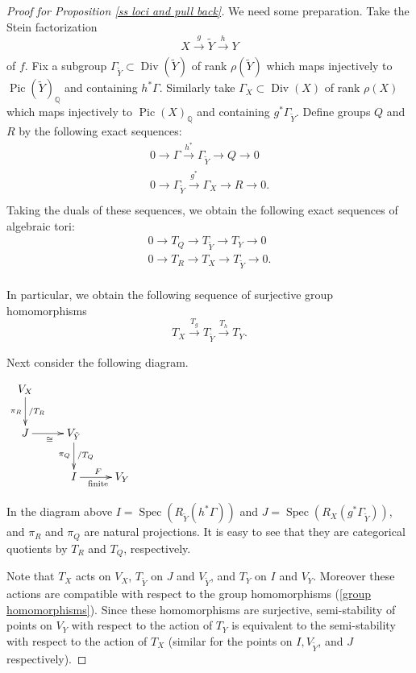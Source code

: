 \documentclass[12pt,twoside]{amsart}
\theoremstyle{definition}
\newcommand\Pic{\mathop{\mathrm{Pic}}\nolimits}
\newcommand\Spec{\mathop{\mathrm{Spec}}\nolimits}
\newcommand\Divi{\mathop{\mathrm{Div}}\nolimits}
\newcommand\bq{\mathbb{Q}}
\begin{document}
\begin{proof}[Proof for Proposition \ref{ss loci and pull back}]

We need some preparation. Take the Stein factorization
\begin{equation*}
X\xrightarrow[]{g}\tilde{Y}\xrightarrow[]{h}Y 
\end{equation*}
of $f$.
Fix a subgroup $\Gamma_{\tilde{Y}}\subset\Divi{(\tilde{Y})}$ of rank $\rho(\tilde{Y})$ which maps 
injectively to $\Pic{(\tilde{Y})}_{\bq}$ and containing $h^{*}\Gamma$.
Similarly take $\Gamma_{X}\subset\Divi{(X)}$ of rank $\rho(X)$ which maps 
injectively to $\Pic{(X)}_{\bq}$ and containing $g^{*}\Gamma_{\tilde{Y}}$.
Define groups $Q$ and $R$ by the following exact sequences:
\begin{eqnarray*}
0\to\Gamma\xrightarrow[]{h^*}\Gamma_{\tilde{Y}}\to Q\to 0 \\
0\to\Gamma_{\tilde{Y}}\xrightarrow[]{g^*}\Gamma_{X}\to R\to 0. \\
\end{eqnarray*}
Taking the duals of these sequences, we obtain the following exact sequences of algebraic tori:
\begin{eqnarray*}
0\to T_Q\to T_{\tilde{Y}}\to T_Y\to 0 \\
0\to T_R\to T_X\to T_{\tilde{Y}}\to 0. \\
\end{eqnarray*}

In particular, we obtain the following sequence of surjective group homomorphisms
\begin{equation}\label{group homomorphisms}
T_X\xrightarrow[]{T_g} T_{\tilde{Y}}\xrightarrow[]{T_h} T_Y.
\end{equation}

Next consider the following diagram.

$\xymatrix{
V_X \ar[d]_{\pi_{R}}^{/T_R} & & \\
J \ar[r]_{\cong} & V_{\tilde{Y}} \ar[d]_{\pi_{Q}}^{/T_Q} & \\
& I \ar[r]_{\textrm{finite}}^{F} & V_Y  \\}$

In the diagram above $I=\Spec{(R_{\tilde{Y}}(h^{*}\Gamma))}$ and
$J=\Spec{(R_X(g^{*}\Gamma_{\tilde{Y}}))}$, and $\pi_R$ and $\pi_Q$ are
natural projections. It is easy to see that they are categorical quotients by
$T_R$ and $T_Q$, respectively.

Note that $T_X$ acts on $V_X$, $T_{\tilde{Y}}$ on $J$ and $V_{\tilde{Y}}$, and
$T_Y$ on $I$ and $V_Y$. Moreover these actions are compatible with respect to the
group homomorphisms (\ref{group homomorphisms}). Since these homomorphisms are
surjective, semi-stability of points on $V_Y$ with respect to the action of $T_Y$ is equivalent
to the semi-stability with respect to the action of $T_X$ (similar for the points on
$I,V_{\tilde{Y}}$, and $J$ respectively).


\end{proof}
\end{document}
